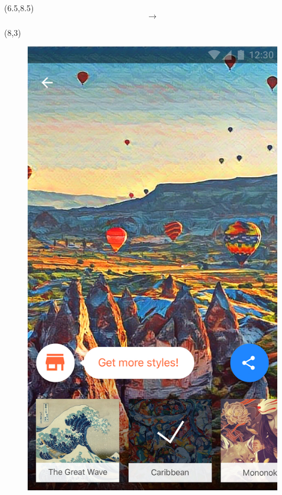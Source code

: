 \documentclass{beamer} %
\begin{document}
\begin{frame}
\begin{textblock}{1}
\begin{figure}
	\end{figure}
 \end{textblock}
 \begin{textblock}{1}(6.5,8.5)
	$$\longrightarrow$$
 \end{textblock}
\begin{textblock}{1}(8,3)
	\begin{figure}
	\includegraphics[scale=0.2]{figures/prismaApp1}
	
	\end{figure}
 \end{textblock}

\end{frame}
\end{document}
